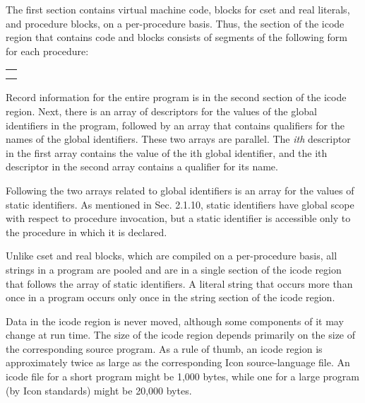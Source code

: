 The first section contains virtual machine code, blocks for cset and
real literals, and procedure blocks, on a per-procedure basis. Thus,
the section of the icode region that contains code and blocks consists
of segments of the following form for each procedure:

\begin{center}
\tabletail{}
\tablelasttail{}
\begin{supertabular}{|m{2.2858598in}|}
\hline
\centering{}\\\hline
\centering{}\\\hline
\centering{}\\\hline
\end{supertabular}
\end{center}

Record information for the entire program is in the second section of
the icode region. Next, there is an array of descriptors for the
values of the global identifiers in the program, followed by an array
that contains qualifiers for the names of the global
identifiers. These two arrays are parallel. The \textit{ith}
descriptor in the first array contains the value of the ith global
identifier, and the ith descriptor in the second array contains a
qualifier for its name.

Following the two arrays related to global identifiers is an array for
the values of static identifiers. As mentioned in Sec. 2.1.10, static
identifiers have global scope with respect to procedure invocation,
but a static identifier is accessible only to the procedure in which
it is declared.

Unlike cset and real blocks, which are compiled on a per-procedure
basis, all strings in a program are pooled and are in a single section
of the icode region that follows the array of static identifiers. A
literal string that occurs more than once in a program occurs only
once in the string section of the icode region.

Data in the icode region is never moved, although some components of
it may change at run time. The size of the icode region depends
primarily on the size of the corresponding source program. As a rule
of thumb, an icode region is approximately twice as large as the
corresponding Icon source-language file. An icode file for a short
program might be 1,000 bytes, while one for a large program (by Icon
standards) might be 20,000 bytes.

